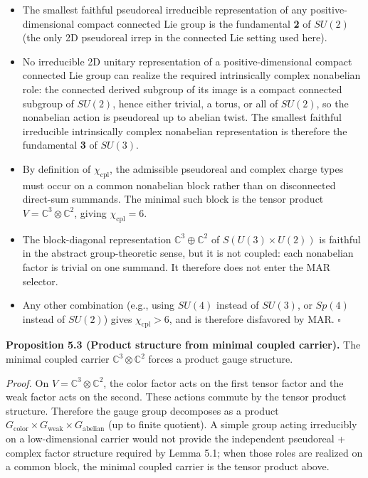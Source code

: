 \begin{itemize}
\tightlist
\item
  The smallest faithful pseudoreal irreducible representation of any positive-dimensional compact connected Lie group is the fundamental \textbf{2} of \(SU(2)\) (the only 2D pseudoreal irrep in the connected Lie setting used here).
\item
  No irreducible 2D unitary representation of a positive-dimensional compact connected Lie group can realize the required intrinsically complex nonabelian role: the connected derived subgroup of its image is a compact connected subgroup of \(SU(2)\), hence either trivial, a torus, or all of \(SU(2)\), so the nonabelian action is pseudoreal up to abelian twist. The smallest faithful irreducible intrinsically complex nonabelian representation is therefore the fundamental \textbf{3} of \(SU(3)\).
\item
  By definition of \(\chi_{\mathrm{cpl}}\), the admissible pseudoreal and complex charge types must occur on a common nonabelian block rather than on disconnected direct-sum summands. The minimal such block is the tensor product \(V = \mathbb{C}^3 \otimes \mathbb{C}^2\), giving \(\chi_{\mathrm{cpl}} = 6\).
\item
  The block-diagonal representation \(\mathbb{C}^3 \oplus \mathbb{C}^2\) of \(S(U(3) \times U(2))\) is faithful in the abstract group-theoretic sense, but it is not coupled: each nonabelian factor is trivial on one summand. It therefore does not enter the MAR selector.
\item
  Any other combination (e.g., using \(SU(4)\) instead of \(SU(3)\), or \(Sp(4)\) instead of \(SU(2)\)) gives \(\chi_{\mathrm{cpl}} > 6\), and is therefore disfavored by MAR. \(\square\)
\end{itemize}

\textbf{Proposition 5.3 (Product structure from minimal coupled carrier).} The minimal coupled carrier \(\mathbb{C}^3 \otimes \mathbb{C}^2\) forces a product gauge structure.

\emph{Proof.} On \(V = \mathbb{C}^3 \otimes \mathbb{C}^2\), the color factor acts on the first tensor factor and the weak factor acts on the second. These actions commute by the tensor product structure. Therefore the gauge group decomposes as a product \(G_{\mathrm{color}} \times G_{\mathrm{weak}} \times G_{\mathrm{abelian}}\) (up to finite quotient). A simple group acting irreducibly on a low-dimensional carrier would not provide the independent pseudoreal + complex factor structure required by Lemma 5.1; when those roles are realized on a common block, the minimal coupled carrier is the tensor product above.


